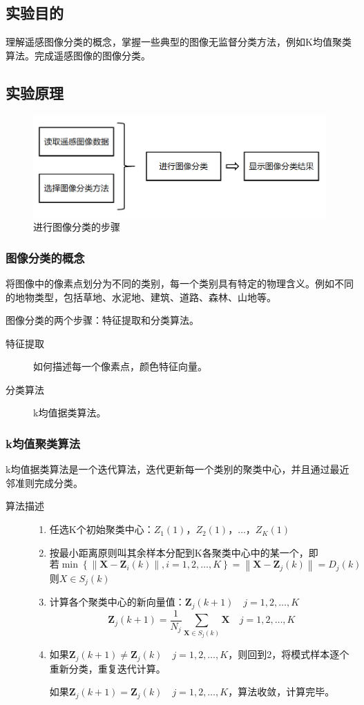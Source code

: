 \subsection{实验目的}
理解遥感图像分类的概念，掌握一些典型的图像无监督分类方法，例如K均值聚类算法。完成遥感图像的图像分类。
\subsection{实验原理}
\begin{figure}[H]
	\centering
	\includegraphics[width=0.7\linewidth]{figure/classification_flowchart.png}
	\caption{进行图像分类的步骤}
\end{figure}
\subsubsection{图像分类的概念}
将图像中的像素点划分为不同的类别，每一个类别具有特定的物理含义。例如不同的地物类型，包括草地、水泥地、建筑、道路、森林、山地等。

图像分类的两个步骤：特征提取和分类算法。
\begin{description}
	\item[特征提取] 如何描述每一个像素点，颜色特征向量。
	\item[分类算法] k均值据类算法。
\end{description}
\subsubsection{k均值聚类算法}
k均值据类算法是一个迭代算法，迭代更新每一个类别的聚类中心，并且通过最近邻准则完成分类。
\begin{description}
	\item[算法描述] \begin{enumerate}
		\item 任选K个初始聚类中心：$Z_1(1)$，$Z_2(1)$，$\dots$，$Z_K(1)$
		\item 按最小距离原则叫其余样本分配到K各聚类中心中的某一个，即
		\[ \text{若} \min\left\lbrace \left\| \mathbf{X}-\mathbf{Z}_i(k) \right\|,i=1,2,\dots,K \right\rbrace=\left\| \mathbf{X}-\mathbf{Z}_j(k) \right\|=D_j(k) \]
		则$X\in S_j(k)$
		\item  计算各个聚类中心的新向量值：$\mathbf{Z}_j(k+1)\quad j=1,2,\dots,K$
		\[ \mathbf{Z}_j(k+1)=\frac{1}{N_j}\sum_{\mathbf{X}\in S_j(k)}\mathbf{X}\quad j=1,2,\dots,K \]
		\item 如果$\mathbf{Z}_j(k+1)\neq\mathbf{Z}_j(k)\quad j=1,2,\dots,K$，则回到2，将模式样本逐个重新分类，重复迭代计算。
		
		如果$\mathbf{Z}_j(k+1)=\mathbf{Z}_j(k)\quad j=1,2,\dots,K$，算法收敛，计算完毕。
	\end{enumerate} 
\end{description}
